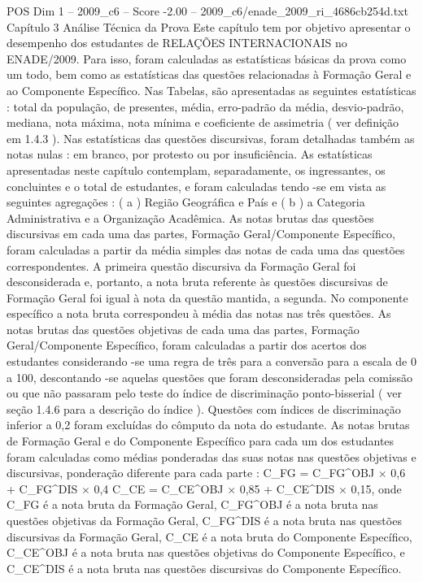 \begin{textsample}{POS Dim 1 – 2009\_c6 – Score -2.00 – 2009\_c6/enade\_2009\_ri\_4686cb254d.txt}  \label{ex:f1_pos_229}
Capítulo 3 Análise Técnica da Prova Este capítulo tem por objetivo apresentar o desempenho dos estudantes de RELAÇÕES INTERNACIONAIS no ENADE/2009.
Para isso, foram calculadas as estatísticas básicas da prova como um todo, bem como as estatísticas das questões relacionadas à Formação Geral e ao Componente Específico.
Nas Tabelas, são apresentadas as seguintes estatísticas : total da população, de presentes, média, erro-padrão da média, desvio-padrão, mediana, nota máxima, nota mínima e coeficiente de assimetria ( ver definição em 1.4.3 ).
Nas estatísticas das questões discursivas, foram detalhadas também as notas nulas : em branco, por protesto ou por insuficiência.
As estatísticas apresentadas neste capítulo contemplam, separadamente, os ingressantes, os concluintes e o total de estudantes, e foram calculadas tendo -se em vista as seguintes agregações : ( a ) Região Geográfica e País e ( b ) a Categoria Administrativa e a Organização Acadêmica.
As notas brutas das questões discursivas em cada uma das partes, Formação Geral/Componente Específico, foram calculadas a partir da média simples das notas de cada uma das questões correspondentes.
A primeira questão discursiva da Formação Geral foi desconsiderada e, portanto, a nota bruta referente às questões discursivas de Formação Geral foi igual à nota da questão mantida, a segunda.
No componente específico a nota bruta correspondeu à média das notas nas três questões.
As notas brutas das questões objetivas de cada uma das partes, Formação Geral/Componente Específico, foram calculadas a partir dos acertos dos estudantes considerando -se uma regra de três para a conversão para a escala de 0 a 100, descontando -se aquelas questões que foram desconsideradas pela comissão ou que não passaram pelo teste do índice de discriminação ponto-bisserial ( ver seção 1.4.6 para a descrição do índice ).
Questões com índices de discriminação inferior a 0,2 foram excluídas do cômputo da nota do estudante.
As notas brutas de Formação Geral e do Componente Específico para cada um dos estudantes foram calculadas como médias ponderadas das suas notas nas questões objetivas e discursivas, ponderação diferente para cada parte : C\_FG = C\_FG\textasciicircum{}OBJ × 0,6 + C\_FG\textasciicircum{}DIS × 0,4 C\_CE = C\_CE\textasciicircum{}OBJ × 0,85 + C\_CE\textasciicircum{}DIS × 0,15, onde C\_FG é a nota bruta da Formação Geral, C\_FG\textasciicircum{}OBJ é a nota bruta nas questões objetivas da Formação Geral, C\_FG\textasciicircum{}DIS é a nota bruta nas questões discursivas da Formação Geral, C\_CE é a nota bruta do Componente Específico, C\_CE\textasciicircum{}OBJ é a nota bruta nas questões objetivas do Componente Específico, e C\_CE\textasciicircum{}DIS é a nota bruta nas questões discursivas do Componente Específico.

\end{textsample}
